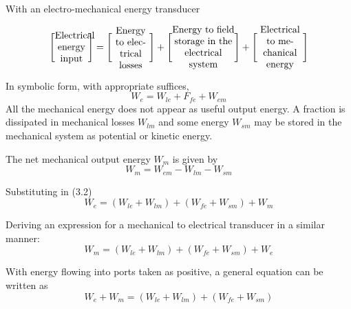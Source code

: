 \documentclass[a4paper,numbers=noenddot,12pt]{scrbook}
\begin{document}
            With an electro-mechanical energy transducer

            \begin{equation}
                \Bigg[
                    \parbox{8ex}{\centering Electrical energy input}
                \Bigg]
                =
                \Bigg[
                    \parbox{9ex}{\centering Energy to electrical losses}
                \Bigg]
                +
                \Bigg[
                    \parbox{15ex}{\centering Energy to field storage in the electrical system}
                \Bigg]
                +
                \Bigg[
                    \parbox{11ex}{\centering Electrical to mechanical energy}
                \Bigg]
                \label{eq:Eq3.1}
            \end{equation}

            In symbolic form, with appropriate suffices,
            \begin{equation}
                W_e = W_{le} + F_{fe} +W_{em}
                \label{eq:Eq3.2}
            \end{equation}
            All the mechanical energy does not appear as useful output energy. A fraction is dissipated in mechanical losses $W_{lm}$ and some energy $W_{sm}$ may be stored in the mechanical system as potential or kinetic energy.

            The net mechanical output energy $W_m$ is given by
            \begin{equation}
                W_m = W_{em} - W_{lm} -W_{sm}
                \label{eq:Eq3.3}
            \end{equation}

            Substituting in (3.2)
            \begin{equation}
                W_e = (W_{le} + W_{lm}) + (W_{fe} + W_{sm}) + W_m
                \label{eq:Eq.3-4}
            \end{equation}

            Deriving an expression for a mechanical to electrical transducer in a similar manner:
            \begin{equation}
                W_m = (W_{le} + W_{lm}) + (W_{fe} + W_{sm}) + W_e 
                \label{eq:Eq3.5}
            \end{equation}

            With energy flowing into ports taken as positive, a general equation can be written as
            \begin{equation}
                W_e + W_m = (W_{le}+ W_{lm}) + (W_{fe} + W_{sm})
                \label{eq_Eq3.6}
            \end{equation}
\end{document}

